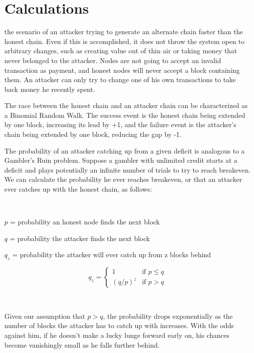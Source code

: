 \documentclass[nohyper]{tufte-handout}
\begin{document}
\section{Calculations}\label{calculations}

 the scenario of an attacker trying to generate an alternate
chain faster than the honest chain. Even if this is accomplished, it
does not throw the system open to arbitrary changes, such as creating
value out of thin air or taking money that never belonged to the
attacker. Nodes are not going to accept an invalid transaction as
payment, and honest nodes will never accept a block containing them. An
attacker can only try to change one of his own transactions to take back
money he recently spent.

The race between the honest chain and an attacker chain can be
characterized as a Binomial Random Walk. The success event is the honest
chain being extended by one block, increasing its lead by +1, and the
failure event is the attacker's chain being extended by one block,
reducing the gap by -1.

The probability of an attacker catching up from a given deficit is
analogous to a Gambler's Ruin problem. Suppose a gambler with unlimited
credit starts at a deficit and plays potentially an infinite number of
trials to try to reach breakeven. We can calculate the probability he
ever reaches breakeven, or that an attacker ever catches up with the
honest chain, as follows\cite{fel57}:

\

\(p\) = {\small probability an honest node finds the next block}

\(q\) = {\small probability the attacker finds the next block}

\(q_z\) = {\small probability the attacker will ever catch up from z blocks behind}

\begin{equation}
    q_z = 
\begin{cases}
    1               & \text{if } p \leqslant q\\
    \left(q/p\right)^z & \text{if } p > q
\end{cases}
\end{equation}

\

Given our assumption that $p > q$, the probability drops
exponentially as the number of blocks the attacker has to catch up with
increases. With the odds against him, if he doesn't make a lucky lunge
forward early on, his chances become vanishingly small as he falls
further behind.
\end{document}
